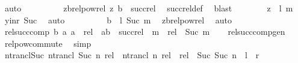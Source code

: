 \begin{isabellebody}
\ auto\isanewline
\ \ \ \ \ \ \isamarkupfalse%
\ \isamarkupfalse%
\ zb{\isacharunderscore}{\kern0pt}relpow{\isacharunderscore}{\kern0pt}rel{\isacharcolon}{\kern0pt}\ {\isachardoublequoteopen}{\isacharparenleft}{\kern0pt}z{\isacharcomma}{\kern0pt}\ b{\isacharparenright}{\kern0pt}\ {\isasymin}\ succ{\isacharunderscore}{\kern0pt}rel{\isachardoublequoteclose}\ \isamarkupfalse%
\ succ{\isacharunderscore}{\kern0pt}rel{\isacharunderscore}{\kern0pt}def\ \isamarkupfalse%
\ blast\isanewline
\ \ \ \ \ \ \isamarkupfalse%
\ {\isachardoublequoteopen}z\ {\isasymin}\ {\isacharquery}{\kern0pt}l\ m{\isachardoublequoteclose}\ \isamarkupfalse%
\ y{\isacharunderscore}{\kern0pt}in{\isacharunderscore}{\kern0pt}r\ Suc\ \isamarkupfalse%
\ auto\isanewline
\ \ \ \ \ \ \isamarkupfalse%
\ \isamarkupfalse%
\ {\isachardoublequoteopen}b\ {\isasymin}\ {\isacharquery}{\kern0pt}l\ {\isacharparenleft}{\kern0pt}Suc\ m{\isacharparenright}{\kern0pt}{\isachardoublequoteclose}\ \isamarkupfalse%
\ zb{\isacharunderscore}{\kern0pt}relpow{\isacharunderscore}{\kern0pt}rel\ \isamarkupfalse%
\ auto\ \isanewline
\ \ \ \ \isamarkupfalse%
\isanewline
\ \ \isamarkupfalse%
\isanewline
{}\isamarkupfalse%
%
\endisatagproof
{\isafoldproof}%
%
\isadelimproof
\isanewline
%
\endisadelimproof
\isanewline
{}\isamarkupfalse%
\ rel{\isacharunderscore}{\kern0pt}succ{\isacharunderscore}{\kern0pt}comp{\isacharcolon}{\kern0pt}\ {\isachardoublequoteopen}{\isacharbraceleft}{\kern0pt}b{\isachardot}{\kern0pt}\ {\isasymexists}a{\isachardot}{\kern0pt}\ a\ {\isasymin}\ rel\ {\isasymand}\ {\isacharparenleft}{\kern0pt}a{\isacharcomma}{\kern0pt}b{\isacharparenright}{\kern0pt}\ {\isasymin}\ succ{\isacharunderscore}{\kern0pt}rel\ {\isacharcircum}{\kern0pt}{\isacharcircum}{\kern0pt}\ m{\isacharbraceright}{\kern0pt}\ {\isacharequal}{\kern0pt}\ rel\ {\isacharcircum}{\kern0pt}{\isacharcircum}{\kern0pt}\ Suc\ m{\isachardoublequoteclose}\isanewline
%
\isadelimproof
\ \ %
\endisadelimproof
%
\isatagproof
{}\isamarkupfalse%
\ rel{\isacharunderscore}{\kern0pt}succ{\isacharunderscore}{\kern0pt}comp{\isacharunderscore}{\kern0pt}gen\ \isamarkupfalse%
\ relpow{\isacharunderscore}{\kern0pt}commute\ \isamarkupfalse%
\ simp%
\endisatagproof
{\isafoldproof}%
%
\isadelimproof
\isanewline
%
\endisadelimproof
\isanewline
{}\isamarkupfalse%
\ ntrancl{\isacharunderscore}{\kern0pt}Suc{\isacharcolon}{\kern0pt}\ {\isachardoublequoteopen}ntrancl\ {\isacharparenleft}{\kern0pt}Suc\ n{\isacharparenright}{\kern0pt}\ rel\ {\isacharequal}{\kern0pt}\ ntrancl\ n\ rel\ {\isasymunion}\ rel\ {\isacharcircum}{\kern0pt}{\isacharcircum}{\kern0pt}\ Suc\ {\isacharparenleft}{\kern0pt}Suc\ n{\isacharparenright}{\kern0pt}{\isachardoublequoteclose}\ {\isacharparenleft}{\kern0pt}\ {\isachardoublequoteopen}{\isacharquery}{\kern0pt}l\ {\isacharequal}{\kern0pt}\ {\isacharquery}{\kern0pt}r{\isachardoublequoteclose}{\isacharparenright}{\kern0pt}\isanewline

\end{isabellebody}
